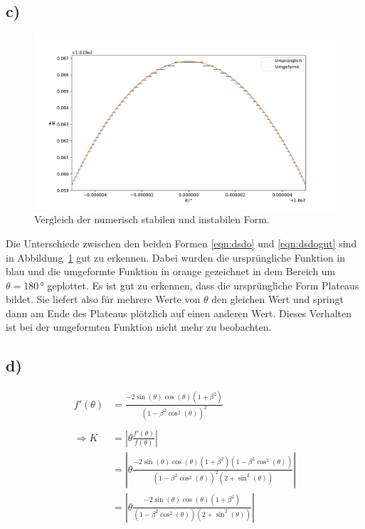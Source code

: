 \documentclass[a4paper, 11pt]{article}
\begin{document}
\subsection*{c)}
\begin{figure}
    \centering
    \includegraphics[width=\textwidth]{../A04/A4_stab.pdf}
    \caption{Vergleich der numerisch stabilen und instabilen Form.}
    \label{fig:4c}
\end{figure}
Die Unterschiede zwischen den beiden Formen \eqref{eqn:dsdo} und \eqref{eqn:dsdogut} sind in Abbildung~\ref{fig:4c} gut zu erkennen.
Dabei wurden die ursprüngliche Funktion in blau und die umgeformte Funktion in orange gezeichnet in dem Bereich um $\theta = 180\,°$ geplottet.
Es ist gut zu erkennen, dass die ursprüngliche Form Plateaus bildet.
Sie liefert also für mehrere Werte von $\theta$ den gleichen Wert und springt dann am Ende des Plateaus plötzlich auf einen anderen Wert.
Dieses Verhalten ist bei der umgeformten Funktion nicht mehr zu beobachten.
\subsection*{d)}
\begin{equation}
    \begin{split}
        f'\left(\theta\right) &= \frac{-2 \sin\left(\theta\right)\cos\left(\theta\right) \left(1+\beta^2\right)}{\left(1-\beta^2 \cos^2\left(\theta\right)\right)^2} \\
        \\
        \Rightarrow K &= \left| \theta  \frac{f'\left(\theta\right)}{f\left(\theta\right)}\right| \\
        &= \left| \theta  \frac{-2 \sin\left(\theta\right)\cos\left(\theta\right)\left(1+\beta^2\right)\left(1-\beta^2 \cos^2\left(\theta\right)\right)}
        {\left(1-\beta^2 \cos^2\left(\theta\right)\right)^2 \left(2+\sin^2\left(\theta\right)\right)} \right| \\
        &= \left| \theta  \frac{-2 \sin\left(\theta\right)\cos\left(\theta\right)\left(1+\beta^2\right)}{\left(1-\beta^2 \cos^2\left(\theta\right)\right) \left(2+\sin^2\left(\theta\right)\right)}\right|
    \end{split}
    \label{eqn:K}
\end{equation}
\end{document}
